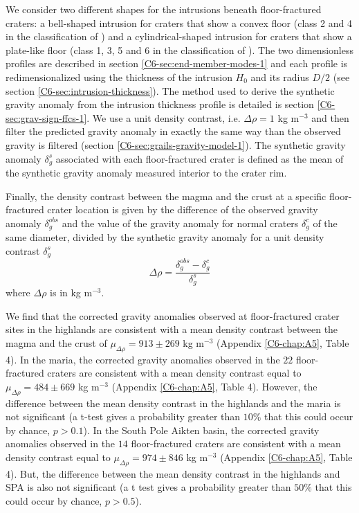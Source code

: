 We  consider   two  different   shapes  for  the   intrusions  beneath
floor-fractured craters: a bell-shaped intrusion for craters that show
a   convex  floor   (class  2   and   4  in   the  classification   of
\citet{Schultz:1976kt}) and a cylindrical-shaped intrusion for craters
that  show  a   plate-like  floor  (class  1,  3,  5   and  6  in  the
classification  of  \citet{Schultz:1976kt}).   The  two  dimensionless
profiles  are described  in  section \ref{C6-sec:end-member-modes-1}  and
each profile is redimensionalized using the thickness of the intrusion
$H_0$      and      its       radius      $D/2$      (see      section
\ref{C6-sec:intrusion-thickness}).   The   method  used  to   derive  the
synthetic  gravity anomaly  from  the intrusion  thickness profile  is
detailed is section \ref{C6-sec:grav-sign-ffcs-1}.  We use a unit density
contrast, i.e.   $\Delta \rho  = 1$  kg m$^{-3}$  and then  filter the
predicted gravity  anomaly in exactly  the same way than  the observed
gravity is  filtered (section  \ref{C6-sec:grails-gravity-model-1}).  The
synthetic   gravity   anomaly   $\delta_g^s$  associated   with   each
floor-fractured crater is defined as the mean of the synthetic gravity
anomaly measured interior to the crater rim.
  
Finally, the  density contrast between  the magma  and the crust  at a
specific floor-fractured crater location is given by the difference of
the observed  gravity anomaly  $\delta_g^{obs}$ and  the value  of the
gravity anomaly for normal craters  $\delta_g^c$ of the same diameter,
divided by the  synthetic gravity anomaly for a  unit density contrast
$\delta_g^s$
\begin{equation}
  \Delta \rho = \frac{\delta_{g}^{obs}-\delta_{g}^c}{\delta_{g}^{s}}
\end{equation}
where $\Delta \rho$ is in kg m$^{-3}$.

We   find   that  the   corrected   gravity   anomalies  observed   at
floor-fractured crater  sites in the  highlands are consistent  with a
mean   density  contrast   between  the   magma  and   the  crust   of
$\mu_{\Delta   \rho}  =   913  \pm   269  $   kg  m$^{-3}$   (Appendix
\ref{C6-chap:A5},  Table  4).   In   the  maria,  the  corrected  gravity
anomalies observed in the  $22$ floor-fractured craters are consistent
with       a      mean       density      contrast       equal      to
$\mu_{\Delta \rho} = 484 \pm 669$ kg m$^{-3}$ (Appendix \ref{C6-chap:A5},
Table 4).  However,  the difference between the  mean density contrast
in the  highlands and the maria  is not significant (a  t-test gives a
probability  greater than  $10\%$  that this  could  occur by  chance,
$p >  0.1$).  In the  South Pole  Aikten basin, the  corrected gravity
anomalies observed in the  $14$ floor-fractured craters are consistent
with       a      mean       density      contrast       equal      to
$\mu_{\Delta   \rho}  =   974  \pm   846  $   kg  m$^{-3}$   (Appendix
\ref{C6-chap:A5}, Table 4).  But, the difference between the mean density
contrast in  the highlands and SPA  is also not significant  (a t test
gives  a probability  greater than  $50\%$  that this  could occur  by
chance, $p > 0.5$).

